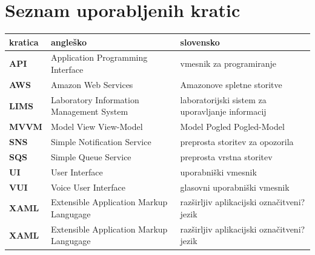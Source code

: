 \documentclass[a4paper, 12pt]{book}
\newcommand{\clearemptydoublepage}{\newpage{\pagestyle{empty}\cleardoublepage}}
\begin{document}
\clearemptydoublepage


\pagestyle{empty}
\def\thepage{}%
\tableofcontents{}


\clearemptydoublepage


\chapter*{Seznam uporabljenih kratic}  %


\noindent\begin{tabular}{p{}|p{}|p{}}    %
  {\bf kratica} & {\bf angleško}                             & {\bf slovensko} \\ \hline
  {\bf API} & Application Programming Interface & vmesnik za programiranje \\
  {\bf AWS} & Amazon Web Services & Amazonove spletne storitve \\
  {\bf LIMS} & Laboratory Information Management System & laboratorijski sistem za uporavljanje informacij \\
  {\bf MVVM} & Model View View-Model & Model Pogled Pogled-Model \\
  {\bf SNS} & Simple Notification Service & preprosta storitev za opozorila \\
  {\bf SQS} & Simple Queue Service & preprosta vrstna storitev \\
  {\bf UI} & User Interface & uporabniški vmesnik \\
  {\bf VUI} & Voice User Interface & glasovni uporabniški vmesnik \\
  {\bf XAML} & Extensible Application Markup Langugage & razširljiv aplikacijski označitveni? jezik \\
  {\bf XAML} & Extensible Application Markup Langugage & razširljiv aplikacijski označitveni? jezik \\
\end{tabular}
\end{document}
